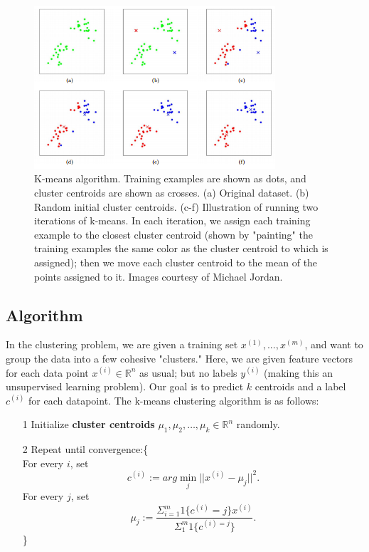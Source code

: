 \documentclass[10pt,letterpaper]{article}
\begin{document}
\begin{figure}[H]
\includegraphics[width=0.8\textwidth]{kmeansViz.png}
\centering
\caption{K-means algorithm. Training examples are shown as dots, and cluster centroids are shown as crosses. (a) Original dataset. (b) Random initial cluster centroids. (c-f) Illustration of running two iterations of k-means. In each iteration, we assign each training example to the closest cluster centroid (shown by "painting" the training examples the same color as the cluster centroid to which is assigned); then we move each cluster centroid to the mean of the points assigned to it. Images courtesy of Michael Jordan.}
\label{figure1}
\end{figure}

\subsection{Algorithm}
In the clustering problem, we are given a training set ${x^{(1)}, ... , x^{(m)}}$, and want to group the data into a few cohesive "clusters." Here, we are given feature vectors for each data point $x^{(i)} \in \mathbb{R}^n$ as usual; but no labels $y^{(i)}$ (making this an unsupervised learning problem). Our goal is to predict $k$ centroids and a label $c^{(i)}$ for each datapoint. The k-means clustering algorithm is as follows:

\begin{itemize}
\item[1] Initialize \textbf{cluster centroids} $\mu_{1}, \mu_{2}, \ldots , \mu_{k} \in \mathbb{R}^{n}$ randomly.
\item[2] Repeat until convergence:\big\{\\

		For every $i$, set \\
		$$c^{(i)}:= arg \min_{j}||x^{(i)}-\mu_{j}||^{2}.$$
		For every $j$, set \\
		$$\mu_{j}:= \frac{\Sigma^{m}_{i=1}1\{c^{(i)}=j\}x^{(i)}}{\Sigma^{m}_{1}1\{c^{(i)=j}\}}.$$
		\big\}
		
\end{itemize}
\end{document}

